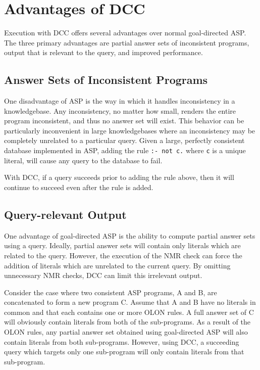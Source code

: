 \documentclass{new_tlp}
\begin{document}
\section{Advantages of DCC} \label{sec:advantages}

Execution with DCC offers several advantages over normal goal-directed ASP. The 
three primary advantages are partial answer sets of inconsistent programs, 
output that is relevant to the query, and improved performance.

\subsection{Answer Sets of Inconsistent Programs}

One disadvantage of ASP is the way in which it handles inconsistency in a 
knowledgebase. Any inconsistency, no matter how small, renders the entire 
program inconsistent, and thus no answer set will exist. This behavior can be 
particularly inconvenient in large knowledgebases where an inconsistency may be 
completely unrelated to a particular query. Given a large, perfectly consistent 
database implemented in ASP, adding the rule \verb|:- not c.| where \texttt{c} 
is a unique literal, will cause any query to the database to fail.

With DCC, if a query succeeds prior to adding the rule above, then it will 
continue to succeed even after the rule is added.

\subsection{Query-relevant Output} \label{sec:outputrelevance}

One advantage of goal-directed ASP is the ability to compute partial answer 
sets using a query.
Ideally, partial answer sets will contain only literals which are related to 
the query. However, the execution of the NMR check can force the addition of
literals which are unrelated to the current query. By omitting unnecessary NMR
checks, DCC can limit this irrelevant output.

Consider the case where two consistent ASP programs, A and B, are concatenated 
to form a new program C. Assume that A and B have no literals in common and 
that each contains one or more OLON rules. A full answer set of C will 
obviously contain literals from both of the sub-programs. As a result of the
OLON rules, any partial answer set obtained using goal-directed ASP will also
contain literals from both sub-programs. However, using DCC, a succeeding query
which targets only one sub-program will only contain literals from that
sub-program.
\end{document}
